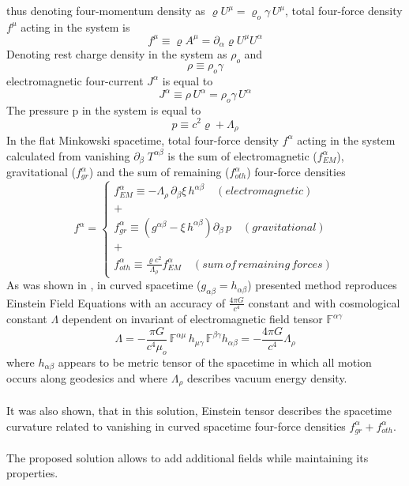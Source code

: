 \documentclass[aps,prx,preprint,groupedaddress,showkeys]{revtex4-2}
\begin{document}
thus denoting four-momentum density as $\varrho U^{\mu} = \varrho_o \gamma \, U^{\mu}$, total four-force density $f^{\mu}$ acting in the system is
\begin{equation} \label{TotFoI}
f^{\mu} \equiv \varrho A^{\mu} = \partial_{\alpha} \varrho U^{\mu} U^{\alpha}
\end{equation}
Denoting rest charge density in the system as $ \rho_o$ and
\begin{equation} \label{RHZERO}
\rho \equiv \rho_o \gamma
\end{equation}
electromagnetic four-current $J^{\alpha}$ is equal to
\begin{equation} \label{EN11}
J^{\alpha} \equiv \rho \, U^{\alpha} = \rho_o \gamma \, U^{\alpha}
\end{equation}
The pressure p in the system is equal to
\begin{equation} \label{Pressure}
p \equiv c^2 \varrho +  \Lambda_{\rho}
\end{equation}
In the flat Minkowski spacetime, total four-force density $f^{\alpha}$ acting in the system calculated from vanishing $\partial_{\beta} \; T^{\alpha \beta}$ is the sum of electromagnetic ($f^{\alpha}_{EM}$), gravitational ($f^{\alpha}_{gr}$) and the sum of remaining ($f^{\alpha}_{oth}$) four-force densities
\begin{equation} \label{forceDen}
f^{\alpha} = 
\begin{cases} 
f^{\alpha}_{EM} \equiv -\Lambda_{\rho} \, \partial_{\beta} \xi \, h^{\alpha \beta} \quad (electromagnetic) \\
+ \\
f^{\alpha}_{gr} \equiv \left ( g^{\alpha \beta} - \xi \, h^{\alpha \beta}  \right ) \partial_{\beta} \, p \quad (gravitational) \\
+ \\
f^{\alpha}_{oth} \equiv \frac{\varrho c^2}{\Lambda_{\rho}} f^{\alpha}_{EM}  \quad (sum \, of\, remaining \, forces)
\end{cases}
\end{equation}
As was shown in \cite{PMofC}, in curved spacetime ($g_{\alpha \beta} =h_{\alpha \beta}$) presented method reproduces Einstein Field Equations with an accuracy of $\frac{4\pi G}{c^4}$ constant and with cosmological constant $\Lambda$ dependent on invariant of electromagnetic field tensor $\mathbb{F}^{\alpha \gamma}$
\begin{equation} \label{CosmoCon}
\Lambda =  - \frac{\pi G}{c^4 \mu_o} \, \mathbb{F}^{\alpha \mu} \, h_{\mu \gamma} \, \mathbb{F}^{ \beta \gamma } h_{\alpha \beta} = - \frac{4\pi G}{c^4} \Lambda_{\rho}
\end{equation}
where $h_{\alpha \beta}$ appears to be metric tensor of the spacetime in which all motion occurs along geodesics and where $\Lambda_{\rho}$ describes vacuum energy density.\\
~\\
It was also shown, that in this solution, Einstein tensor describes the spacetime curvature related to vanishing in curved spacetime four-force densities $f^{\alpha}_{gr} + f^{\alpha}_{oth}$.\\
~\\
The proposed solution allows to add additional fields while maintaining its properties.
\end{document}
